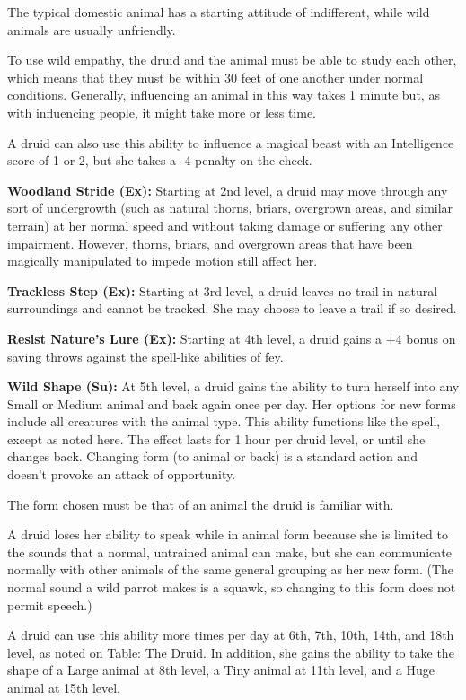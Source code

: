The typical domestic animal has a starting attitude of indifferent, while wild animals are usually unfriendly.

To use wild empathy, the druid and the animal must be able to study each other, which means that they must be within 30 feet of one another under normal conditions. Generally, influencing an animal in this way takes 1 minute but, as with influencing people, it might take more or less time.

A druid can also use this ability to influence a magical beast with an Intelligence score of 1 or 2, but she takes a -4 penalty on the check.

\textbf{Woodland Stride (Ex):} Starting at 2nd level, a druid may move through any sort of undergrowth (such as natural thorns, briars, overgrown areas, and similar terrain) at her normal speed and without taking damage or suffering any other impairment. However, thorns, briars, and overgrown areas that have been magically manipulated to impede motion still affect her.

\textbf{Trackless Step (Ex):} Starting at 3rd level, a druid leaves no trail in natural surroundings and cannot be tracked. She may choose to leave a trail if so desired.

\textbf{Resist Nature's Lure (Ex):} Starting at 4th level, a druid gains a +4 bonus on saving throws against the spell-like abilities of fey.

\textbf{Wild Shape (Su):} At 5th level, a druid gains the ability to turn herself into any Small or Medium animal and back again once per day. Her options for new forms include all creatures with the animal type. This ability functions like the  spell, except as noted here. The effect lasts for 1 hour per druid level, or until she changes back. Changing form (to animal or back) is a standard action and doesn't provoke an attack of opportunity.

The form chosen must be that of an animal the druid is familiar with. 

A druid loses her ability to speak while in animal form because she is limited to the sounds that a normal, untrained animal can make, but she can communicate normally with other animals of the same general grouping as her new form. (The normal sound a wild parrot makes is a squawk, so changing to this form does not permit speech.)

A druid can use this ability more times per day at 6th, 7th, 10th, 14th, and 18th level, as noted on Table: The Druid. In addition, she gains the ability to take the shape of a Large animal at 8th level, a Tiny animal at 11th level, and a Huge animal at 15th level.

